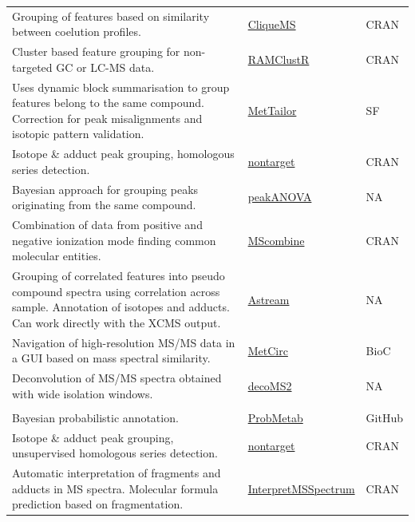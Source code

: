 \documentclass[]{article}
\begin{document}
\begin{longtable}[t]{>{\raggedright\arraybackslash}p{30em}>{\raggedright\arraybackslash}p{10em}>{\raggedright\arraybackslash}p{3em}}
\rowcolor{gray!6}  Grouping of features based on similarity between coelution profiles. & \href{https://cran.r-project.org/web/packages/cliqueMS/}{CliqueMS} & CRAN\\
Cluster based feature grouping for non-targeted GC or LC-MS data. & \href{https://github.com/cbroeckl/RAMClustR}{RAMClustR} & CRAN\\
\rowcolor{gray!6}  Uses dynamic block summarisation to group features belong to the same compound. Correction for peak misalignments and isotopic pattern validation. & \href{https://sourceforge.net/projects/mettailor/}{MetTailor} & SF\\
Isotope {\&} adduct peak grouping, homologous series detection. & \href{https://cran.r-project.org/web/packages/nontarget/}{nontarget} & CRAN\\
\rowcolor{gray!6}  Bayesian approach for grouping peaks originating from the same compound. & \href{http://research.cs.aalto.fi/pml/software/peakANOVA/}{peakANOVA} & NA\\
Combination of data from positive and negative ionization mode finding common molecular entities. & \href{https://cran.r-project.org/package=MScombine}{MScombine} & CRAN\\
\rowcolor{gray!6}  Grouping of correlated features into pseudo compound spectra using correlation across sample. Annotation of isotopes and adducts. Can work directly with the XCMS output. & \href{http://www.urr.cat/AStream/AStream.html}{Astream} & NA\\
Navigation of high-resolution MS/MS data in a GUI based on mass spectral similarity. & \href{https://bioconductor.org/packages/release/bioc/html/MetCirc.html}{MetCirc} & BioC\\
\rowcolor{gray!6}  Deconvolution of MS/MS spectra obtained with wide isolation windows. & \href{http://pattilab.wustl.edu/software/decoms2/decoms2.php}{decoMS2} & NA\\
\addlinespace[0.3em]
\multicolumn{3}{l}{\textbf{Ion/adduct/fragment annotation}}\\
Bayesian probabilistic annotation. & \href{https://github.com/rsilvabioinfo/ProbMetab}{ProbMetab} & GitHub\\
\rowcolor{gray!6}  Isotope {\&} adduct peak grouping, unsupervised homologous series detection. & \href{https://cran.r-project.org/web/packages/nontarget/}{nontarget} & CRAN\\
Automatic interpretation of fragments and adducts in MS spectra. Molecular formula prediction based on fragmentation. & \href{https://cran.r-project.org/package=InterpretMSSpectrum}{InterpretMSSpectrum} & CRAN\\

\end{longtable}
\end{document}

